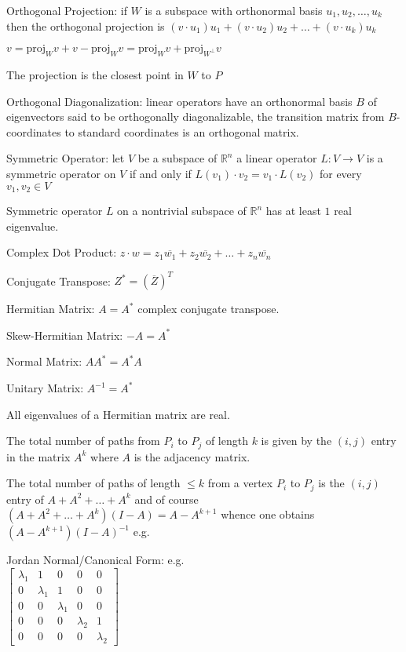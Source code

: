 Orthogonal Projection: if $W$ is a subspace with orthonormal basis ${u_1,u_2,\dots,u_k}$ then the orthogonal projection is $(v \cdot u_1) u_1 + (v \cdot u_2) u_2 + \dots + (v \cdot u_k) u_k$

$v=\text{proj}_W v +v-\text{proj}_W v=\text{proj}_W v+\text{proj}_{W^{\perp}} v$

The projection is the closest point in $W$ to $P$

Orthogonal Diagonalization: linear operators have an orthonormal basis $B$ of eigenvectors said to be orthogonally diagonalizable, the transition matrix from $B$-coordinates to standard coordinates is an orthogonal matrix.

Symmetric Operator: let $V$ be a subspace of $\mathbb{R}^n$ a linear operator $L: V \to V$ is a symmetric operator on $V$ if and only if $L(v_1) \cdot v_2 = v_1 \cdot L(v_2)$ for every $v_1 , v_2 \in V$

Symmetric operator $L$ on a nontrivial subspace of $\mathbb{R}^n$ has at least $1$ real eigenvalue.

Complex Dot Product: $z \cdot w = z_1 \overline{w_1} + z_2 \overline{w_2} + \dots + z_n \overline{w_n}$

Conjugate Transpose: $Z^{*} = \left( \overline{Z} \right)^T$

Hermitian Matrix: $A=A^*$ complex conjugate transpose.

Skew-Hermitian Matrix: $-A=A^*$

Normal Matrix: $A A^* = A^* A$

Unitary Matrix: $A^{-1}=A^*$

All eigenvalues of a Hermitian matrix are real.

The total number of paths from $P_i$ to $P_j$ of length $k$ is given by the $(i,j)$ entry in the matrix $A^k$ where $A$ is the adjacency matrix.

The total number of paths of length $\le k$ from a vertex $P_i$ to $P_j$ is the $(i,j)$ entry of $A+A^2+\dots+A^k$ and of course $(A+A^2+\dots+A^k)(I-A)=A-A^{k+1}$ whence one obtains $(A-A^{k+1})(I-A)^{-1}$ e.g.

Jordan Normal/Canonical Form: e.g. \\ 
$\begin{bmatrix}
\lambda_1 & 1 & 0 & 0 & 0 \\
0 & \lambda_1 & 1 & 0 & 0 \\
0 & 0 & \lambda_1 & 0 & 0 \\
0 & 0 & 0 & \lambda_2 & 1 \\
0 & 0 & 0 & 0 & \lambda_2
\end{bmatrix}$


